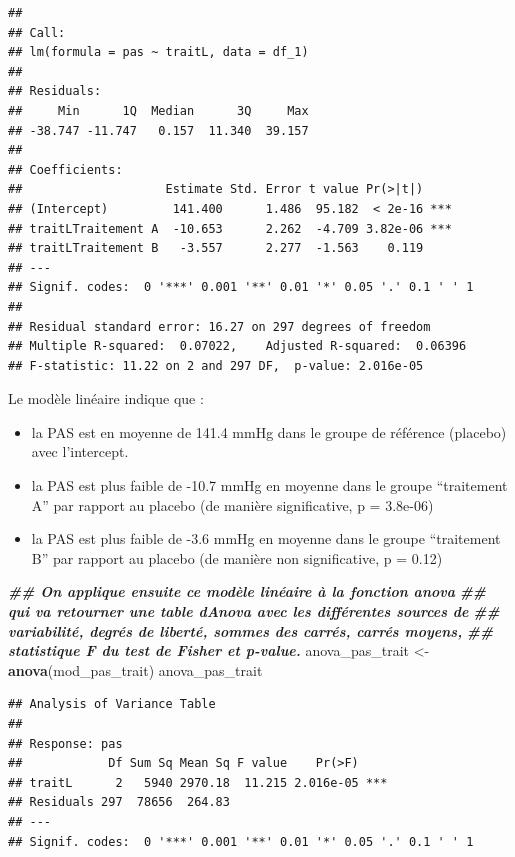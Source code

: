 \documentclass[
]{book}
\newenvironment{Shaded}{\begin{snugshade}}{\end{snugshade}}
\newcommand{\DocumentationTok}[1]{\textcolor[rgb]{0.56,0.35,0.01}{\textbf{\textit{#1}}}}
\newcommand{\FunctionTok}[1]{\textcolor[rgb]{0.13,0.29,0.53}{\textbf{#1}}}
\newcommand{\NormalTok}[1]{#1}
\newcommand{\OtherTok}[1]{\textcolor[rgb]{0.56,0.35,0.01}{#1}}
\providecommand{\tightlist}{%
  \setlength{\itemsep}{0pt}\setlength{\parskip}{0pt}}
\begin{document}
\begin{verbatim}
## 
## Call:
## lm(formula = pas ~ traitL, data = df_1)
## 
## Residuals:
##     Min      1Q  Median      3Q     Max 
## -38.747 -11.747   0.157  11.340  39.157 
## 
## Coefficients:
##                    Estimate Std. Error t value Pr(>|t|)    
## (Intercept)         141.400      1.486  95.182  < 2e-16 ***
## traitLTraitement A  -10.653      2.262  -4.709 3.82e-06 ***
## traitLTraitement B   -3.557      2.277  -1.563    0.119    
## ---
## Signif. codes:  0 '***' 0.001 '**' 0.01 '*' 0.05 '.' 0.1 ' ' 1
## 
## Residual standard error: 16.27 on 297 degrees of freedom
## Multiple R-squared:  0.07022,    Adjusted R-squared:  0.06396 
## F-statistic: 11.22 on 2 and 297 DF,  p-value: 2.016e-05
\end{verbatim}

Le modèle linéaire indique que :

\begin{itemize}
\tightlist
\item
  la PAS est en moyenne de 141.4 mmHg dans le groupe de référence (placebo) avec l'intercept.
\item
  la PAS est plus faible de -10.7 mmHg en moyenne dans le groupe ``traitement A'' par rapport au placebo (de manière significative, p = 3.8e-06)
\item
  la PAS est plus faible de -3.6 mmHg en moyenne dans le groupe ``traitement B'' par rapport au placebo (de manière non significative, p = 0.12)
\end{itemize}

\begin{Shaded}
\begin{Highlighting}[]
\DocumentationTok{\#\# On applique ensuite ce modèle linéaire à la fonction anova}
\DocumentationTok{\#\# qui va retourner une table d\textquotesingle{}Anova avec les différentes sources de }
\DocumentationTok{\#\# variabilité, degrés de liberté, sommes des carrés, carrés moyens, }
\DocumentationTok{\#\# statistique F du test de Fisher et p{-}value.}
\NormalTok{anova\_pas\_trait }\OtherTok{\textless{}{-}} \FunctionTok{anova}\NormalTok{(mod\_pas\_trait) }
\NormalTok{anova\_pas\_trait}
\end{Highlighting}
\end{Shaded}

\begin{verbatim}
## Analysis of Variance Table
## 
## Response: pas
##            Df Sum Sq Mean Sq F value    Pr(>F)    
## traitL      2   5940 2970.18  11.215 2.016e-05 ***
## Residuals 297  78656  264.83                      
## ---
## Signif. codes:  0 '***' 0.001 '**' 0.01 '*' 0.05 '.' 0.1 ' ' 1
\end{verbatim}
\end{document}
